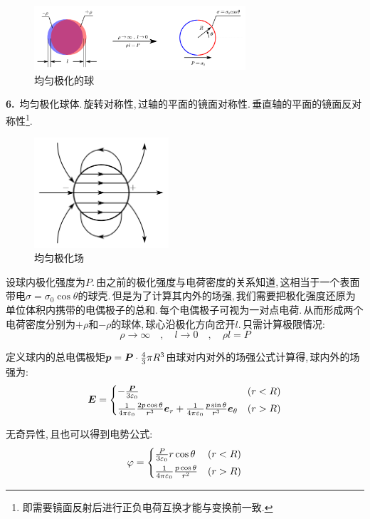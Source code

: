 \begin{figure}[H]
\centering
\includegraphics[width=0.7\textwidth]{image/7-1-21.png}
\caption{均匀极化的球}\label{fig7-1-21}
\end{figure}

\textbf{6.}\, 均匀极化球体.\,旋转对称性,\,过轴的平面的镜面对称性.\,垂直轴的平面的镜面反对称性\footnote{即需要镜面反射后进行正负电荷互换才能与变换前一致.}.

\begin{figure}
\vspace{-0.4cm}
\centering
\includegraphics[width=5cm]{image/7-1-22.png}
\caption{均匀极化场}
\end{figure}
设球内极化强度为$P$.\,由之前的极化强度与电荷密度的关系知道,\,这相当于一个表面带电$\sigma=\sigma_0\cos\theta$的球壳.\,但是为了计算其内外的场强,\,我们需要把极化强度还原为单位体积内携带的电偶极子的总和.\,每个电偶极子可视为一对点电荷.\,从而形成两个电荷密度分别为$+\rho$和$-\rho$的球体,\,球心沿极化方向岔开$l$.\,只需计算极限情况:
\[\rho\to \infty \quad,\quad l\to 0 \quad,\quad \rho l=P\]

定义球内的总电偶极矩$\boldsymbol{p}=\boldsymbol{P}\cdot\frac{4}{3}\pi R^3$由球对内对外的场强公式计算得,\,球内外的场强为:
\[\boldsymbol{E}=\begin{cases}
-\frac{\boldsymbol{P}}{3\varepsilon_0}&(r<R)\\[3pt]
\frac{1}{4\pi\varepsilon_0} \frac{2p\cos\theta}{r^3}\boldsymbol{e}_r + \frac{1}{4\pi\varepsilon_0} \frac{p\sin\theta}{r^3}\boldsymbol{e}_\theta &(r>R)
\end{cases}\]

无奇异性,\,且也可以得到电势公式:
\[\varphi=\begin{cases}
\frac{P}{3\varepsilon_0}r\cos\theta &(r<R)\\[3pt]
\frac{1}{4\pi\varepsilon_0} \frac{p\cos\theta}{r^2}&(r>R)
\end{cases}\]

